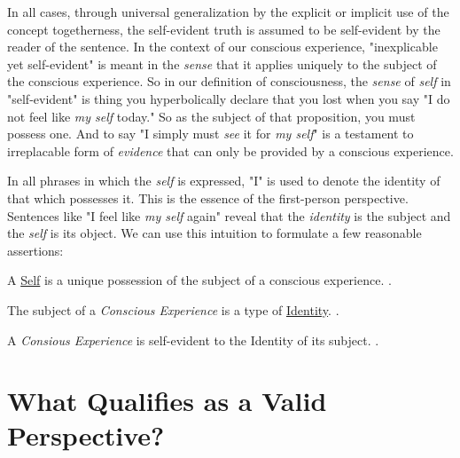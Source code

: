 \documentclass[runningheads]{llncs}
\begin{document}
In all cases, through universal generalization by the explicit or implicit use of the concept togetherness, the self-evident truth is assumed to be self-evident by the reader of the sentence. In the context of our conscious experience, "inexplicable yet self-evident" is meant in the \emph{sense} that it applies uniquely to the subject of the conscious experience. So in our definition of consciousness, the \emph{sense} of \emph{self} in "self-evident" is thing you hyperbolically declare that you lost when you say "I do not feel like \emph{my self} today." So as the subject of that proposition, you must possess one. And to say "I simply must \emph{see} it for \emph{my self}" is a testament to irreplacable form of \emph{evidence} that can only be provided by a conscious experience.

In all phrases in which the \emph{self} is expressed, "I" is used to denote the identity of that which possesses it. This is the essence of the first-person perspective. Sentences like "I feel like \emph{my self} again" reveal that the \emph{identity} is the subject and the \emph{self} is its object. We can use this intuition to formulate a few reasonable assertions: 

\setcounter{definition}{0}
\begin{assertion}
	A \href{https://github.com/DNA-Platform/inexplicable-phenomena/formalism/assertions/self.pdf}{Self} is a unique possession of the subject of a conscious experience. \cite{Formalism}.
\end{assertion}

\setcounter{definition}{1}
\begin{assertion}
	The subject of a \emph{Conscious Experience} is a type of \href{https://github.com/DNA-Platform/inexplicable-phenomena/formalism/assertions/identity.pdf}{Identity}. \cite{Formalism}.
\end{assertion}

\setcounter{definition}{1}
\begin{assertion}
	A \emph{Consious Experience} is self-evident to the Identity of its subject. \cite{Formalism}.
\end{assertion}


\section{What Qualifies as a Valid Perspective?}
\end{document}

